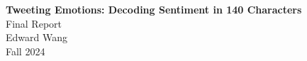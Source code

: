 \documentclass{article}
\begin{document}
\begin{titlepage}
    \centering
    \vspace*{1in}

    {\Huge \textbf{Tweeting Emotions: Decoding Sentiment in 140 Characters}}\\
    \vspace{0.5in}
    {\huge Final Report \\}
    \vspace{0.5in}
    {\huge Edward Wang \\}
    \vspace{0.25in}
    {\huge Fall 2024}

    \vfill
\end{titlepage}




\end{document}
